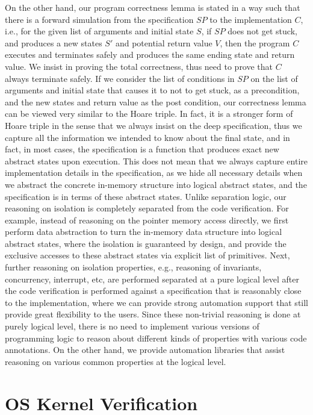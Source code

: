On the other hand, our program correctness lemma is stated in a way such that there is a forward simulation from the specification $SP$
to the implementation $C$, i.e., for the given list of arguments and initial state $S$, if $SP$ does not get stuck, and produces a new 
states $S'$ and potential return value $V$, then the program $C$ executes and terminates safely and produces the same ending state and return value.
We insist in proving the total correctness, thus need to prove that $C$ always terminate safely.
If we consider the list of conditions in $SP$ on the list of arguments and initial state that causes it to not to get stuck, as a precondition,
and the new states and return value as the post condition, our correctness lemma can be viewed very similar to the Hoare triple.
In fact, it is a stronger form of Hoare triple in the sense that we always insist on the deep specification, thus we capture all the information
we intended to know about the final state, and in fact, in most cases, the specification is a function that produces exact new abstract states upon 
execution. This does not mean that we always capture entire implementation details in the specification, as we hide all necessary details
when we abstract the concrete in-memory structure into logical abstract states, and the specification is in terms of these abstract states.
Unlike separation logic, our reasoning on isolation is completely separated from the code verification. For example, instead of reasoning
on the pointer memory access directly, we first perform data abstraction to turn the in-memory data structure into logical abstract states,
where the isolation is guaranteed by design, and provide the exclusive accesses to these abstract states via explicit list of primitives.
Next, further reasoning on isolation properties, e.g., reasoning of invariants, concurrency, interrupt, etc, are performed separated
at a pure logical level after the code verification is performed against a specification that is reasonably close to the implementation,
where we can provide strong automation support that still provide great flexibility to the users.
Since these non-trivial reasoning is done at purely logical level, there is no need to implement various versions of programming logic
to reason about different kinds of properties with various code annotations.
On the other hand, we provide automation libraries that assist reasoning on various common properties at the logical level. 


\section{OS Kernel Verification}

